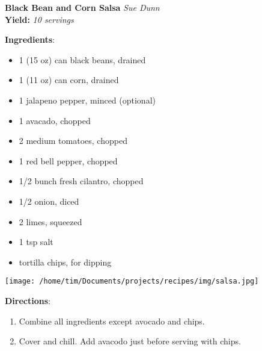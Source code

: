 \documentclass[11pt, twoside, openany]{book}
\begin{document}
\noindent\begin{minipage}[t]{\linewidth}%
{\Large\textbf{Black Bean and Corn Salsa}} \label{black-bean-and-corn-salsa}\hfill\textit{Sue Dunn}\\
\textbf{Yield:} \textit{10 servings}\\
\noindent\begin{minipage}[t]{0.78\linewidth}%
\textbf{Ingredients}:\vspace{-3mm}
\begin{multicols}{2}
\begin{itemize}\setlength\itemsep{-1mm}
\item 1 (15 oz) can black beans, drained
\item 1 (11 oz) can corn, drained
\item 1 jalapeno pepper, minced (optional)
\item 1 avacado, chopped
\item 2 medium tomatoes, chopped
\item 1 red bell pepper, chopped
\item 1/2 bunch fresh cilantro, chopped
\item 1/2 onion, diced
\item 2 limes, squeezed
\item 1 tsp salt
\item tortilla chips, for dipping
\end{itemize}
\end{multicols}
\end{minipage}
\noindent\begin{minipage}[t]{0.18\linewidth}
\centering \strut\vspace*{-\baselineskip}\newline
\texttt{[image: /home/tim/Documents/projects/recipes/img/salsa.jpg]}\\
\end{minipage}\vspace{3mm}
\textbf{Directions}:
\vspace{-3mm}\begin{enumerate}\setlength\itemsep{-1mm}
\item Combine all ingredients except avocado and chips.
\item Cover and chill. Add avacodo just before serving with chips.
\end{enumerate}
\end{minipage}\vspace{8mm}
\end{document}
